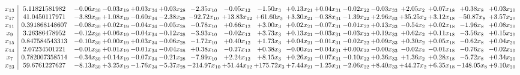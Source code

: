 \documentclass[9pt]{article}
\begin{document}
 \[\begin{array}{c| c c@{\hskip 2pt} c@{\hskip 2pt} c@{\hskip 2pt} c@{\hskip 2pt} c@{\hskip 2pt} c@{\hskip 2pt} c@{\hskip 2pt} c@{\hskip 2pt} c@{\hskip 2pt} c@{\hskip 2pt} c@{\hskip 2pt} c@{\hskip 2pt} c@{\hskip 2pt} c@{\hskip 2pt} c@{\hskip 2pt} }
 x_{13}   &  5.11821581982 & -0.06 x_{30} & -0.03 x_{19} & +  0.03 x_{34} & +  0.03 x_{28} & -2.35 x_{10} & -0.05 x_{12} & -1.50 x_{3} & +  0.13 x_{21} & +  0.04 x_{31} & -0.02 x_{22} & -0.03 x_{33} & +  2.05 x_{2} & +  0.07 x_{18} & +  0.38 x_{8} & +  0.03 x_{20}\\
 x_{17}   &  41.0450117971 & -3.89 x_{30} & +  1.08 x_{19} & -0.60 x_{34} & -2.38 x_{28} & -92.72 x_{10} & + 13.83 x_{12} & + 61.60 x_{3} & +  3.30 x_{21} & -0.38 x_{31} & -1.39 x_{22} & +  2.96 x_{33} & + 35.25 x_{2} & +  3.12 x_{18} & -50.87 x_{8} & +  3.57 x_{20}\\
 x_{11}   &  0.391868148607 & -0.08 x_{30} & +  0.02 x_{19} & -0.04 x_{34} & -0.05 x_{28} & -0.78 x_{10} & +  0.66 x_{12} & +  3.00 x_{3} & +  0.02 x_{21} & -0.07 x_{31} & -0.01 x_{22} & +  0.13 x_{33} & -0.54 x_{2} & +  0.02 x_{18} & -1.96 x_{8} & +  0.08 x_{20}\\
 x_{9}   &  3.26386478952 & -0.12 x_{30} & +  0.06 x_{19} & -0.04 x_{34} & -0.12 x_{28} & -3.93 x_{10} & -0.02 x_{12} & +  3.73 x_{3} & +  0.13 x_{21} & -0.03 x_{31} & -0.03 x_{22} & +  0.19 x_{33} & +  0.62 x_{2} & +  0.11 x_{18} & -3.56 x_{8} & +  0.15 x_{20}\\
 x_{15}   &  0.847584543313 & -0.10 x_{30} & +  0.00 x_{19} & +  0.03 x_{34} & -0.06 x_{28} & -1.72 x_{10} & +  0.40 x_{12} & +  1.73 x_{3} & +  0.04 x_{21} & -0.01 x_{31} & -0.02 x_{22} & +  0.09 x_{33} & +  0.30 x_{2} & +  0.05 x_{18} & -0.62 x_{8} & +  0.04 x_{20}\\
 x_{14}   &  2.07234501221 & -0.01 x_{30} & +  0.01 x_{19} & -0.01 x_{34} & -0.04 x_{28} & +  0.38 x_{10} & -0.27 x_{12} & +  0.38 x_{3} & -0.00 x_{21} & -0.04 x_{31} & +  0.00 x_{22} & -0.00 x_{33} & -0.02 x_{2} & -0.01 x_{18} & -0.76 x_{8} & -0.02 x_{20}\\
 x_{7}   &  0.782007358514 & -0.34 x_{30} & +  0.14 x_{19} & -0.07 x_{34} & -0.21 x_{28} & -7.99 x_{10} & +  2.24 x_{12} & +  8.15 x_{3} & +  0.26 x_{21} & -0.07 x_{31} & -0.10 x_{22} & +  0.36 x_{33} & +  1.36 x_{2} & +  0.28 x_{18} & -5.72 x_{8} & +  0.34 x_{20}\\
 x_{23}   &  59.6761227627 & -8.13 x_{30} & +  3.25 x_{19} & -1.76 x_{34} & -5.37 x_{28} & -214.97 x_{10} & + 51.44 x_{12} & + 175.72 x_{3} & +  7.44 x_{21} & -1.25 x_{31} & -2.06 x_{22} & +  8.40 x_{33} & + 44.27 x_{2} & +  6.35 x_{18} & -148.05 x_{8} & +  9.10 x_{20}\\

\end{array}\]
\end{document}

